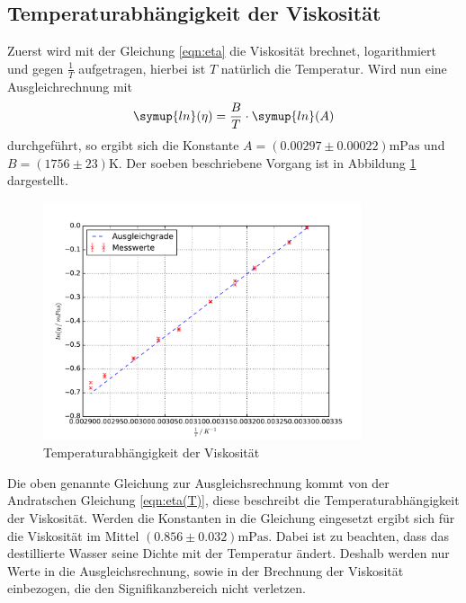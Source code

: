 \subsection{Temperaturabhängigkeit der Viskosität}
Zuerst wird mit der Gleichung \eqref{eqn:eta} die Viskosität brechnet, logarithmiert
und gegen $\frac{1}{T}$ aufgetragen, hierbei ist $T$ natürlich die Temperatur.
Wird nun eine Ausgleichrechnung mit
\begin{equation*}
  \symup{ln}(\eta)= \frac{B}{T}\cdot\symup{ln}(A)
\end{equation*}
durchgeführt, so ergibt sich die Konstante $ A =  (0.00297 \pm 0.00022)
\si{\milli\pascal\second}$ und $B = (1756 \pm 23) \si{\kelvin}$. Der soeben
beschriebene Vorgang ist in Abbildung \ref{fig:plot} dargestellt.
\begin{figure}
  \centering
  \includegraphics[height= 7cm]{Plots/plot.pdf}
  \caption{Temperaturabhängigkeit der Viskosität}
  \label{fig:plot}
\end{figure}
Die oben genannte Gleichung zur Ausgleichsrechnung kommt von der Andratschen
Gleichung \eqref{eqn:eta(T)}, diese beschreibt die Temperaturabhängigkeit der
Viskosität.
Werden die Konstanten in die Gleichung eingesetzt ergibt sich für die Viskosität
im Mittel $(0.856 \pm 0.032) \si{\milli\pascal\second}$. Dabei ist zu beachten,
dass das destillierte Wasser seine Dichte mit der Temperatur ändert. Deshalb
werden nur Werte in die Ausgleichsrechnung, sowie in der Brechnung der
Viskosität einbezogen, die den Signifikanzbereich nicht verletzen.
